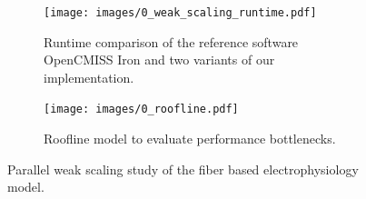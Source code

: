 % 

\begin{figure}[H]
  \centering%
  \begin{subfigure}[t]{0.48\textwidth}%
    \centering%
    \texttt{[image: images/0\_weak\_scaling\_runtime.pdf]} %
    \caption{Runtime comparison of the reference software OpenCMISS Iron and two variants of our implementation.}%
    \label{fig:strong_scaling_runtime}%
  \end{subfigure}
  \hfill
  \begin{subfigure}[t]{0.5\textwidth}%
    \centering%
    \texttt{[image: images/0\_roofline.pdf]}%
    \caption{Roofline model to evaluate performance bottlenecks.}%
    \label{fig:0_roofline}%
  \end{subfigure}   
  \caption{Parallel weak scaling study of the fiber based electrophysiology model.}%
  \label{fig:weak_scaling}%
\end{figure}%

